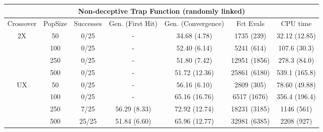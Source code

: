 \documentclass[]{scrartcl}
\begin{document}
\begin{table}
	\small
	\tabcolsep=0.09cm
	\begin{tabular}{|c|c|c|c|c|c|c|}
		\hline
		\multicolumn{7}{|c|}{Non-deceptive Trap Function (randomly linked)}                                              \\ \hline
		Crossover           & PopSize & Successes & Gen. (First Hit) & Gen. (Convergence) & Fct Evals    & CPU time      \\ \hline
		\multirow{4}{*}{2X} & 50      & 0/25      & -                & 34.68 (4.78)       & 1735 (239)   & 32.12 (12.85) \\ \cline{2-7} 
		& 100     & 0/25      & -                & 52.40 (6.14)       & 5241 (614)   & 107.6 (30.3)  \\ \cline{2-7} 
		& 250     & 0/25      & -                & 51.80 (7.42)       & 12951 (1856) & 278.3 (84.0)  \\ \cline{2-7} 
		& 500     & 0/25      & -                & 51.72 (12.36)      & 25861 (6180) & 539.1 (165.8) \\ \hline
		\multirow{4}{*}{UX} & 50      & 0/25      & -                & 56.16 (6.10)       & 2809 (305)   & 78.60 (49.88) \\ \cline{2-7} 
		& 100     & 0/25      & -                & 65.16 (16.76)      & 6517 (1676)  & 356.4 (196.4) \\ \cline{2-7} 
		& 250     & 7/25      & 56.29 (8.33)     & 72.92 (12.74)      & 18231 (3185) & 1146 (561)    \\ \cline{2-7} 
		& 500     & 25/25     & 51.84 (6.60)     & 65.96 (12.77)      & 32981 (6385) & 2208 (927)    \\ \hline
	\end{tabular}
\end{table}
\end{document}
